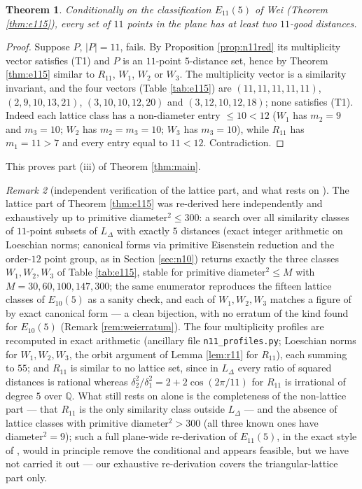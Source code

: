\documentclass[11pt]{article}
\newtheorem{theorem}{Theorem}[section]
\theoremstyle{definition}
\theoremstyle{remark}
\newtheorem{remark}[theorem]{Remark}
\newcommand{\Q}{\mathbb{Q}}
\newcommand{\Lat}{L_{\Delta}}
\begin{document}
\begin{theorem}\label{thm:n11}
Conditionally on the classification $E_{11}(5)$ of Wei \cite[Theorem~13]{Wei11}
(Theorem \ref{thm:e115}), every set of $11$ points in the plane has at least two
$11$-good distances.
\end{theorem}

\begin{proof}
Suppose $P$, $|P| = 11$, fails. By Proposition \ref{prop:n11red} its multiplicity vector
satisfies (T1) and $P$ is an $11$-point $5$-distance set, hence by Theorem \ref{thm:e115}
similar to $R_{11}$, $W_1$, $W_2$ or $W_3$. The multiplicity vector is a similarity
invariant, and the four vectors (Table \ref{tab:e115}) are $(11,11,11,11,11)$,
$(2,9,10,13,21)$, $(3,10,10,12,20)$ and $(3,12,10,12,18)$; none satisfies (T1). Indeed
each lattice class has a non-diameter entry $\le 10 < 12$ ($W_1$ has $m_2 = 9$ and
$m_3 = 10$; $W_2$ has $m_2 = m_3 = 10$; $W_3$ has $m_3 = 10$), while $R_{11}$ has
$m_1 = 11 > 7$ and every entry equal to $11 < 12$. Contradiction.
\end{proof}

This proves part (iii) of Theorem \ref{thm:main}.

\begin{remark}[independent verification of the lattice part, and what rests on
\cite{Wei11}]\label{rem:weiverif11}
The lattice part of Theorem \ref{thm:e115} was re-derived here independently and
exhaustively up to primitive diameter$^2 \le 300$: a search over all similarity classes of $11$-point subsets of $\Lat$ with
exactly $5$ distances (exact integer arithmetic on Loeschian norms; canonical forms via
primitive Eisenstein reduction and the order-$12$ point group, as in Section
\ref{sec:n10}) returns exactly the three classes $W_1, W_2, W_3$ of Table \ref{tab:e115},
stable for primitive diameter$^2 \le M$ with $M = 30, 60, 100, 147, 300$; the same
enumerator reproduces the fifteen lattice classes of $E_{10}(5)$ as a sanity check, and
each of $W_1, W_2, W_3$ matches a figure of \cite[Figure~4]{Wei11} by exact canonical form
--- a clean bijection, with no erratum of the kind found for $E_{10}(5)$ (Remark
\ref{rem:weierratum}). The four multiplicity profiles are recomputed in exact arithmetic
(ancillary file \texttt{n11\_profiles.py}; Loeschian norms for $W_1, W_2, W_3$, the orbit
argument of Lemma \ref{lem:r11} for $R_{11}$), each summing to $55$; and $R_{11}$ is
similar to no lattice set, since in $\Lat$ every ratio of squared distances is rational
whereas $\delta_2^2/\delta_1^2 = 2 + 2\cos(2\pi/11)$ for $R_{11}$ is irrational of degree
$5$ over $\Q$. What still rests on \cite{Wei11} alone is the completeness of the
non-lattice part --- that $R_{11}$ is the only similarity class outside $\Lat$ --- and the
absence of lattice classes with primitive diameter$^2 > 300$ (all three known ones have
diameter$^2 = 9$); such a full plane-wide re-derivation of $E_{11}(5)$, in the exact style
of \cite{SzOs20}, would in principle remove the conditional and appears feasible, but we
have not carried it out --- our exhaustive re-derivation covers the triangular-lattice
part only.
\end{remark}
\end{document}
